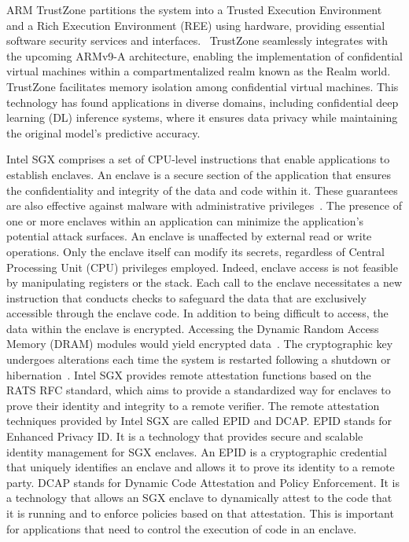 \begin{newj}
ARM TrustZone partitions the system into a Trusted Execution Environment and a Rich Execution Environment (REE) using hardware, providing essential software security services and interfaces.~\cite{DBLP:journals/corr/abs-2306-11011} TrustZone seamlessly integrates with the upcoming ARMv9-A architecture, enabling the implementation of confidential virtual machines within a compartmentalized realm known as the Realm world.\cite{DBLP:conf/codaspy/IslamZKKH23, zhu2023investigating} TrustZone facilitates memory isolation among confidential virtual machines.\cite{DBLP:conf/cpsweek/SarkerITF23} This technology has found applications in diverse domains, including confidential deep learning (DL) inference systems, where it ensures data privacy while maintaining the original model's predictive accuracy. 


Intel SGX comprises a set of CPU-level instructions that enable applications to establish enclaves. An enclave is a secure section of the application that ensures the confidentiality and integrity of the data and code within it. These guarantees are also effective against malware with administrative privileges~\citep{zheng2021survey}. The presence of one or more enclaves within an application can minimize the application’s potential attack surfaces. An enclave is unaffected by external read or write operations. Only the enclave itself can modify its secrets, regardless of Central Processing Unit (CPU) privileges employed. Indeed, enclave access is not feasible by manipulating registers or the stack. Each call to the enclave necessitates a new instruction that conducts checks to safeguard the data that are exclusively accessible through the enclave code. In addition to being difficult to access, the data within the enclave is encrypted. Accessing the Dynamic Random Access Memory (DRAM) modules would yield encrypted data~\citep{jauernig2020trusted}. The cryptographic key undergoes alterations each time the system is restarted following a shutdown or hibernation~\citep{costan2016intel}. Intel SGX provides remote attestation functions based on the RATS RFC standard, which aims to provide a standardized way for enclaves to prove their identity and integrity to a remote verifier. The remote attestation techniques provided by Intel SGX are called EPID and DCAP. EPID stands for Enhanced Privacy ID. It is a technology that provides secure and scalable identity management for SGX enclaves. An EPID is a cryptographic credential that uniquely identifies an enclave and allows it to prove its identity to a remote party. DCAP stands for Dynamic Code Attestation and Policy Enforcement. It is a technology that allows an SGX enclave to dynamically attest to the code that it is running and to enforce policies based on that attestation. This is important for applications that need to control the execution of code in an enclave.


\end{newj}
